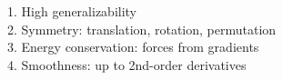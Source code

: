 \documentclass[preview]{standalone}
\begin{document}
1. High generalizability\\2. Symmetry: translation, rotation, permutation\\3. Energy conservation: forces from gradients\\4. Smoothness: up to 2nd-order derivatives\\
\end{document}
